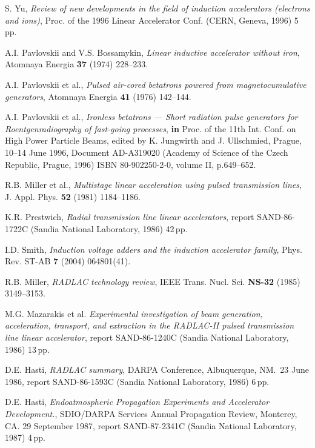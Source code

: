 \documentclass [12pt,a4paper,     ]{report} %
\begin{document}
\begin{enumerate}
 S. Yu, \emph{Review of new developments in the field of induction accelerators (electrons and ions)}, Proc. of the 1996 Linear Accelerator Conf. (CERN, Geneva, 1996) 5\,pp.

 A.I. Pavlovskii and V.S. Bossamykin, \emph{Linear inductive accelerator without iron}, Atomnaya Energia {\bf 37} (1974) 228--233. 

 A.I. Pavlovskii et al., \emph{Pulsed air-cored betatrons powered from magnetocumulative generators}, Atomnaya Energia {\bf 41} (1976) 142--144.

 A.I. Pavlovskii et al., \emph{Ironless betatrons --- Short radiation pulse generators for Roentgenradiography of fast-going processes}, {\bf in} Proc. of the 11th Int. Conf. on High Power Particle Beams, edited by K. Jungwirth and J. Ullschmied, Prague, 10--14 June 1996, Document AD-A319020 (Academy of Science of the Czech Republic, Prague, 1996) ISBN 80-902250-2-0, volume II, p.649--652.

 R.B. Miller et al., \emph{Multistage linear acceleration using pulsed transmission lines}, J. Appl. Phys. {\bf 52} (1981) 1184--1186.

 K.R. Prestwich, \emph{Radial transmission line linear accelerators}, report SAND-86-1722C (Sandia National Laboratory, 1986) 42\,pp.

 I.D. Smith, \emph{Induction voltage adders and the induction accelerator family}, Phys. Rev. ST-AB {\bf 7} (2004) 064801(41).

 R.B. Miller, \emph{RADLAC technology review}, IEEE Trans. Nucl. Sci. {\bf NS-32} (1985) 3149--3153.

 M.G. Mazarakis et al. \emph{Experimental investigation of beam generation, acceleration, transport, and extraction in the RADLAC-II pulsed transmission line linear accelerator}, report SAND-86-1240C (Sandia National Laboratory, 1986) 13\,pp.

 D.E. Hasti, \emph{RADLAC summary}, DARPA Conference, Albuquerque, NM.\ 23 June 1986, report SAND-86-1593C (Sandia National Laboratory, 1986) 6\,pp.

 D.E. Hasti, \emph{Endoatmospheric Propagation Experiments and Accelerator Development.}, SDIO/DARPA Services Annual Propagation Review, Monterey, CA. 29 September 1987, report SAND-87-2341C (Sandia National Laboratory, 1987) 4\,pp.


\end{enumerate}
\end{document}
